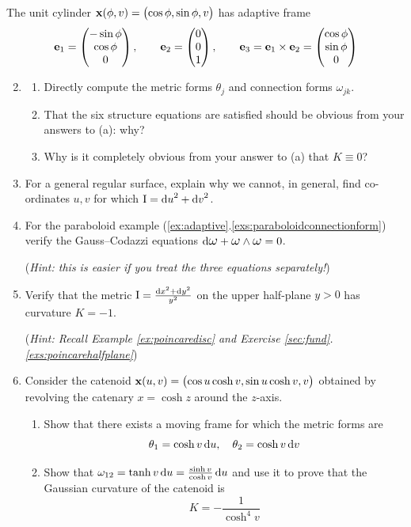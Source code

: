\begin{exercises}{}{}
	\exstart The unit cylinder ${\mathbf{x}}(\phi,v)=\bigl(\cos\phi,\sin\phi,v\bigr)$ has adaptive frame
	\[
		{\mathbf{e}}_1=\begin{pmatrix}-\sin\phi\\\cos\phi\\0\end{pmatrix},\qquad {\mathbf{e}}_2=\begin{pmatrix}0\\0\\1\end{pmatrix},\qquad {\mathbf{e}}_3={\mathbf{e}}_1\times{\mathbf{e}}_2=\begin{pmatrix}\cos\phi\\\sin\phi\\0\end{pmatrix}
	\]
	\begin{enumerate}\setcounter{enumi}{1}
	  \item[]\begin{enumerate} 
	    \item Directly compute the metric forms $\theta_j$ and connection forms $\omega_{jk}$.
	    \item That the six structure equations are satisfied should be obvious from your answers to (a): why? 
	    \item Why is it completely obvious from your answer to (a) that $K\equiv 0$?
	  \end{enumerate}
  
  
  	\item For a general regular surface, explain why we cannot, in general, find co-ordinates $u,v$ for which $\mathrm{I}={\mathrm{d} u}^2+{\mathrm{d} v}^2$.
  
  
  	\item For the paraboloid example (\ref*{ex:adaptive}.\ref{exs:paraboloidconnectionform}) verify the Gauss--Codazzi equations $\D\lomega+\lomega\wedge\lomega=0$.\par
 	 (\emph{Hint: this is easier if you treat the three equations separately!}) 
  
  
  	\item Verify that the metric $\mathrm{I}=\frac{{\mathrm{d} x}^2+{\mathrm{d} y}^2}{y^2}$ on the upper half-plane $y>0$ has curvature $K=-1$.\par
  	(\emph{Hint: Recall Example \ref{ex:poincaredisc} and Exercise \ref*{sec:fund}.\ref{exs:poincarehalfplane}})
  

		\item\label{exs:catenoidgauss} Consider the catenoid ${\mathbf{x}}(u,v)=\bigl(\cos u\cosh v,\sin u\cosh v,v\bigr)$ obtained by revolving the catenary $x=\cosh z$ around the $z$-axis.
		\begin{enumerate}
	  	\item Show that there exists a moving frame for which the metric forms are
	  	\[
	  		\theta_1=\cosh v\,{\mathrm{d} u},\quad \theta_2=\cosh v\,{\mathrm{d} v}
	  	\]
	  	\item Show that $\omega_{12}=\tanh v\,{\mathrm{d} u} =\frac{\sinh v}{\cosh v}\,{\mathrm{d} u}$ and use it to prove that the Gaussian curvature of the catenoid is
	  	\[
	  		K=-\frac 1{\cosh^4v}
	  	\]
		\end{enumerate}
	

\end{enumerate}
\end{exercises}
